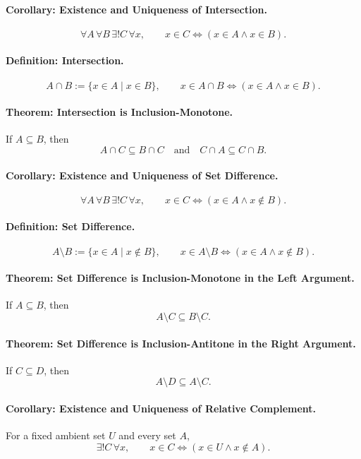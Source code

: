 \paragraph{Corollary: Existence and Uniqueness of Intersection.}
\[
  \forall A\,\forall B\,\exists!C\,\forall x,\qquad
  x\in C\Longleftrightarrow (x\in A\land x\in B).
\]

\paragraph{Definition: Intersection.}
\[
  A\cap B:=\{x\in A\mid x\in B\},
  \qquad
  x\in A\cap B
  \Longleftrightarrow
  (x\in A\land x\in B).
\]

\paragraph{Theorem: Intersection is Inclusion-Monotone.}
If \(A\subseteq B\), then
\[
  A\cap C\subseteq B\cap C
  \quad\text{and}\quad
  C\cap A\subseteq C\cap B.
\]

\paragraph{Corollary: Existence and Uniqueness of Set Difference.}
\[
  \forall A\,\forall B\,\exists!C\,\forall x,\qquad
  x\in C\Longleftrightarrow (x\in A\land x\notin B).
\]

\paragraph{Definition: Set Difference.}
\[
  A\setminus B:=\{x\in A\mid x\notin B\},
  \qquad
  x\in A\setminus B
  \Longleftrightarrow
  (x\in A\land x\notin B).
\]

\paragraph{Theorem: Set Difference is Inclusion-Monotone in the Left Argument.}
If \(A\subseteq B\), then
\[
  A\setminus C\subseteq B\setminus C.
\]

\paragraph{Theorem: Set Difference is Inclusion-Antitone in the Right Argument.}
If \(C\subseteq D\), then
\[
  A\setminus D\subseteq A\setminus C.
\]

\paragraph{Corollary: Existence and Uniqueness of Relative Complement.}
For a fixed ambient set \(U\) and every set \(A\),
\[
  \exists!C\,\forall x,\qquad
  x\in C\Longleftrightarrow (x\in U\land x\notin A).
\]

